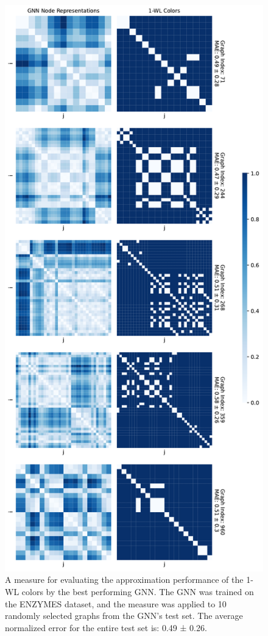 \begin{figure}[!ht]
\begin{minipage}[b]{0.45992852703\textwidth}
    \end{minipage}
    \hfill
    \begin{minipage}[b]{0.53007147296\textwidth}
        \includegraphics[width=\textwidth, right]{Figures/heatmaps_PROTEINS_1.pdf}
    \end{minipage}
    \hfill
    \caption{A measure for evaluating the approximation performance of the 1-WL colors by the best performing GNN. The GNN was trained on the ENZYMES dataset, and the measure was applied to 10 randomly selected graphs from the GNN's test set. The average normalized error for the entire test set is: 0.49 ± 0.26.}
\end{figure}
